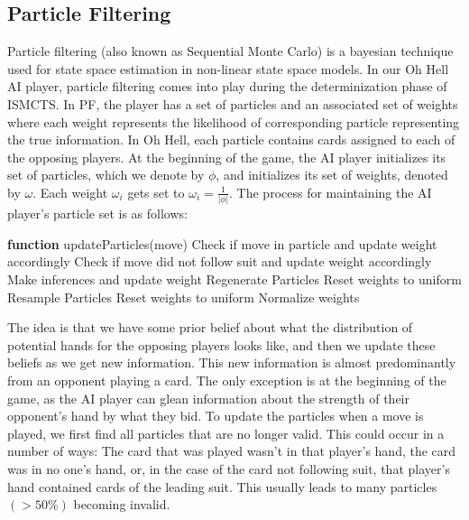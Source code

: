 \documentclass{article}
\begin{document}
\subsection{Particle Filtering}
\label{subsection:ParticleFiltering}
Particle filtering (also known as Sequential Monte Carlo) is a bayesian technique used for state space estimation in non-linear state space models. In our Oh Hell AI player, particle filtering comes into play during the determinization phase of ISMCTS. 
In PF, the player has a set of particles and an associated set of weights where each weight represents the likelihood of corresponding particle representing the true information. In Oh Hell, each particle contains cards assigned to each of the opposing players.
At the beginning of the game, the AI player initializes its set of particles, which we denote by $\phi$, and initializes its set of weights, denoted by $\omega$. Each weight $\omega_i$ gets set to $\omega_i=\frac{1}{|\phi|}$. The process for maintaining the AI player's particle set is as follows:
\begin{algorithm}[H]
    \caption{Updating Particles}
    \label{alg:particleFiltering}
    \begin{algorithmic}[1]
        \State \textbf{function} updateParticles(move)
            \State Check if move in particle and update weight accordingly
            \State Check if move did not follow suit and update weight accordingly
            \State Make inferences and update weight
        \EndFor
            \State Regenerate Particles
            \State Reset weights to uniform
        \EndIf
            \State Resample Particles
            \State Reset weights to uniform
        \Else
            \State Normalize weights
        \EndIf
    \end{algorithmic}
\end{algorithm}

The idea is that we have some prior belief about what the distribution of potential hands for the opposing players looks like, and then we update these beliefs as we get new information. This new information is almost predominantly from an opponent playing a card. 
The only exception is at the beginning of the game, as the AI player can glean information about the strength of their opponent's hand by what they bid. 
To update the particles when a move is played, we first find all particles that are no longer valid. This could occur in a number of ways: The card that was played wasn't in that player's hand, the card was in no one's hand, or, in the case of the card not following suit, that player's hand contained cards of the leading suit.
This usually leads to many particles $(>50\%)$ becoming invalid. 
\end{document}
